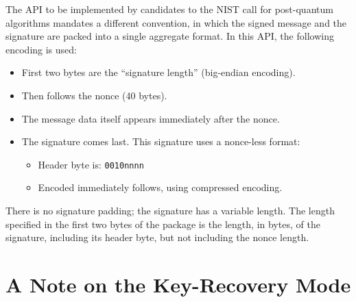 The API to be implemented by candidates to the NIST call for
post-quantum algorithms mandates a different convention, in which the
signed message and the signature are packed into a single aggregate
format. In this API, the following encoding is used:
\begin{itemize}

    \item First two bytes are the ``signature length'' (big-endian
    encoding).

    \item Then follows the nonce \salt (40 bytes).

    \item The message data itself appears immediately after the nonce.

    \item The signature comes last. This signature uses a nonce-less
    format:
    \begin{itemize}
        \item Header byte is: \texttt{0010nnnn}
        \item Encoded \comps immediately follows, using compressed
        encoding.
    \end{itemize}

\end{itemize}
There is no signature padding; the signature has a variable length. The
length specified in the first two bytes of the package is the length,
in bytes, of the signature, including its header byte, but not including
the nonce length.

\section{A Note on the Key-Recovery Mode}\label{sec:key-recovery}


